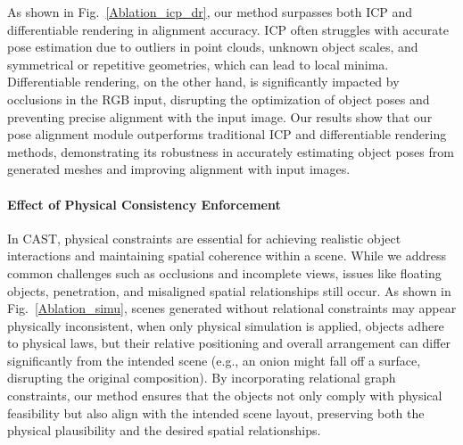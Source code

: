 As shown in Fig.~\ref{Ablation_icp_dr}, our method surpasses both ICP and differentiable rendering in alignment accuracy. ICP often struggles with accurate pose estimation due to outliers in point clouds, unknown object scales, and symmetrical or repetitive geometries, which can lead to local minima. Differentiable rendering, on the other hand, is significantly impacted by occlusions in the RGB input, disrupting the optimization of object poses and preventing precise alignment with the input image. Our results show that our pose alignment module outperforms traditional ICP and differentiable rendering methods, demonstrating its robustness in accurately estimating object poses from generated meshes and improving alignment with input images.





\paragraph{Effect of Physical Consistency Enforcement}
In CAST, physical constraints are essential for achieving realistic object interactions and maintaining spatial coherence within a scene. While we address common challenges such as occlusions and incomplete views, issues like floating objects, penetration, and misaligned spatial relationships still occur. As shown in Fig.~\ref{Ablation_simu}, scenes generated without relational constraints may appear physically inconsistent, when only physical simulation is applied, objects adhere to physical laws, but their relative positioning and overall arrangement can differ significantly from the intended scene (e.g., an onion might fall off a surface, disrupting the original composition).  By incorporating relational graph constraints, our method ensures that the objects not only comply with physical feasibility but also align with the intended scene layout, preserving both the physical plausibility and the desired spatial relationships.



